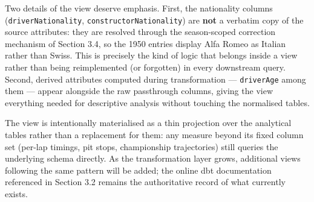 \documentclass[
]{article}
\begin{document}
\begin{table}[!h]
\centering\begingroup\fontsize{9}{11}\selectfont

\endgroup{}
\end{table}

Two details of the view deserve emphasis. First, the nationality columns
(\texttt{driverNationality}, \texttt{constructorNationality}) are
\textbf{not} a verbatim copy of the source attributes: they are resolved
through the season-scoped correction mechanism of Section 3.4, so the
1950 entries display Alfa Romeo as Italian rather than Swiss. This is
precisely the kind of logic that belongs inside a view rather than being
reimplemented (or forgotten) in every downstream query. Second, derived
attributes computed during transformation --- \texttt{driverAge} among
them --- appear alongside the raw passthrough columns, giving the view
everything needed for descriptive analysis without touching the
normalised tables.

The view is intentionally materialised as a thin projection over the
analytical tables rather than a replacement for them: any measure beyond
its fixed column set (per-lap timings, pit stops, championship
trajectories) still queries the underlying schema directly. As the
transformation layer grows, additional views following the same pattern
will be added; the online dbt documentation referenced in Section 3.2
remains the authoritative record of what currently exists.

\newpage
\end{document}
